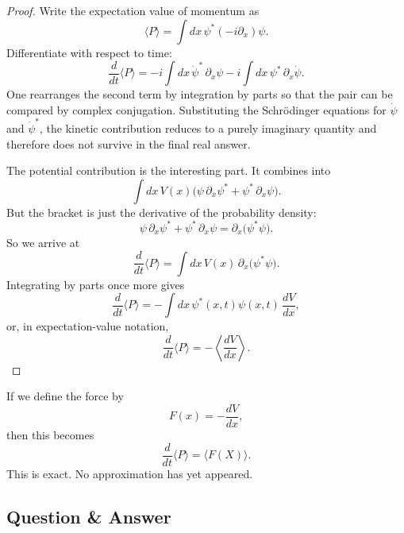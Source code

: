 \begin{proof}
Write the expectation value of momentum as
\begin{equation}
\langle P\rangle=\int dx\,\psi^*(-i\partial_x)\psi.
\end{equation}
Differentiate with respect to time:
\begin{equation}
\frac{d}{dt}\langle P\rangle
=
-i\int dx\,\dot{\psi}^*\,\partial_x\psi
-i\int dx\,\psi^*\,\partial_x\dot{\psi}.
\end{equation}
One rearranges the second term by integration by parts so that the pair can be compared by complex conjugation. Substituting the Schr\"odinger equations for \(\dot{\psi}\) and \(\dot{\psi}^*\), the kinetic contribution reduces to a purely imaginary quantity and therefore does not survive in the final real answer.

The potential contribution is the interesting part. It combines into
\begin{equation}
\int dx\,V(x)\bigl(\psi\,\partial_x\psi^*+\psi^*\,\partial_x\psi\bigr).
\end{equation}
But the bracket is just the derivative of the probability density:
\begin{equation}
\psi\,\partial_x\psi^*+\psi^*\,\partial_x\psi
=
\partial_x\bigl(\psi^*\psi\bigr).
\end{equation}
So we arrive at
\begin{equation}
\frac{d}{dt}\langle P\rangle
=
\int dx\,V(x)\,\partial_x\bigl(\psi^*\psi\bigr).
\end{equation}
Integrating by parts once more gives
\begin{equation}
\frac{d}{dt}\langle P\rangle
=
-\int dx\,\psi^*(x,t)\psi(x,t)\,\frac{dV}{dx},
\end{equation}
or, in expectation-value notation,
\begin{equation}
\frac{d}{dt}\langle P\rangle=-\left\langle \frac{dV}{dx}\right\rangle.
\end{equation}
\end{proof}

If we define the force by
\begin{equation}
F(x)=-\frac{dV}{dx},
\end{equation}
then this becomes
\begin{equation}
\frac{d}{dt}\langle P\rangle=\langle F(X)\rangle.
\end{equation}
This is exact. No approximation has yet appeared.

\subsection{Question \& Answer}

